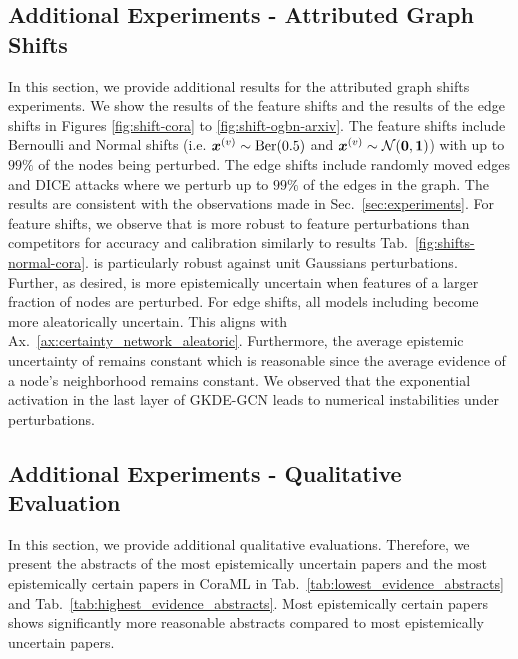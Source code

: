 \subsection{Additional Experiments - Attributed Graph Shifts}

In this section, we provide additional results for the attributed graph shifts experiments. We show the results of the feature shifts and the results of the edge shifts in Figures \ref{fig:shift-cora} to \ref{fig:shift-ogbn-arxiv}. The feature shifts include Bernoulli and Normal shifts (i.e. $\bm{x}^{(v)} \sim \operatorname{Ber}(0.5)$ and $\bm{x}^{(v)} \sim \operatorname{\mathcal{N}}(\bm{0}, \bm{1})$) with up to $99\%$ of the nodes being perturbed. The edge shifts include randomly moved edges and DICE attacks \citep{Waniek2018} where we perturb up to $99\%$ of the edges in the graph. The results are consistent with the observations made in Sec.~\ref{sec:experiments}. For feature shifts, we observe that \oursacro{} is more robust to feature perturbations than competitors for accuracy and calibration similarly to results Tab.~\ref{fig:shifts-normal-cora}. \oursacro{} is particularly robust against unit Gaussians perturbations. Further, as desired, \oursacro{} is more epistemically uncertain when features of a larger fraction of nodes are perturbed. For edge shifts, all models including \oursacro{} become more aleatorically uncertain. This aligns with Ax.~\ref{ax:certainty_network_aleatoric}. Furthermore, the average epistemic uncertainty of \oursacro{} remains constant which is reasonable since the average evidence of a node's neighborhood remains constant. We observed that the exponential activation in the last layer of GKDE-GCN leads to numerical instabilities under perturbations.
%








%

\subsection{Additional Experiments - Qualitative Evaluation}
\label{sec:add-exp-qualitative}

In this section, we provide additional qualitative evaluations. Therefore, we present the abstracts of the most epistemically uncertain papers and the most epistemically certain papers in CoraML in Tab.~\ref{tab:lowest_evidence_abstracts} and Tab.~\ref{tab:highest_evidence_abstracts}. Most epistemically certain papers shows significantly more reasonable abstracts compared to most epistemically uncertain papers.

